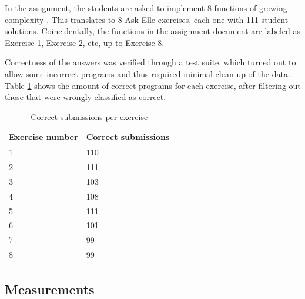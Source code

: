 

In the assignment, the students are asked to implement 8 functions of growing complexity \cite{assignment1}. This translates to 8 Ask-Elle exercises, each one with 111 student solutions. Coincidentally, the functions in the assignment document are labeled as Exercise 1, Exercise 2, etc, up to Exercise 8.

Correctness of the answers was verified through a test suite, which turned out to allow some incorrect programs and thus required minimal clean-up of the data. Table \ref{tb:correct-submissions-per-exercise} shows the amount of correct programs for each exercise, after filtering out those that were wrongly classified as correct.

\begin{table}[H]
\centering
\begin{tabular}{ m{12em} | m{12em} }
    Exercise number & Correct submissions \\
    \hline
    1 & 110 \\
    \hline
    2 & 111 \\
    \hline
    3 & 103 \\
    \hline
    4 & 108 \\
    \hline
    5 & 111 \\
    \hline
    6 & 101 \\
    \hline
    7 & 99 \\
    \hline
    8 & 99
\end{tabular}
\caption{Correct submissions per exercise}
\label{tb:correct-submissions-per-exercise}
\end{table}

\subsection{Measurements}

